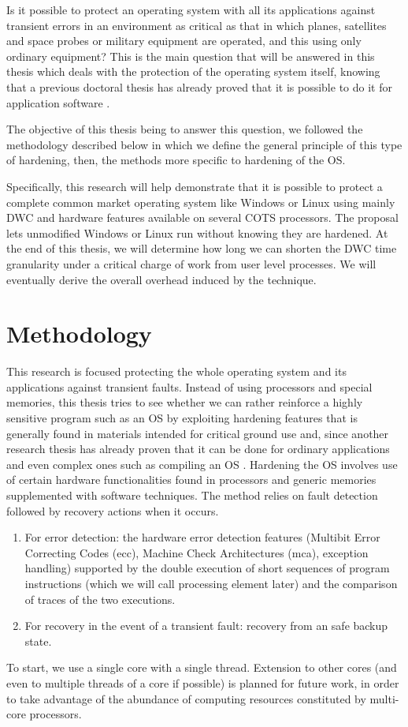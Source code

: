 Is it possible to protect an operating system with all its applications against transient errors in an environment as critical as that in which planes, satellites and space probes or military equipment are operated, and this using only ordinary equipment? This is the main question that will be answered in this thesis which deals with the protection of the operating system itself, knowing that a previous doctoral thesis has already proved that it is possible to do it for application software \citep{emery_assogba}.

The objective of this thesis being to answer this question, we followed the methodology described below in which we define the general principle of this type of hardening, then, the methods more specific to hardening of the OS.

Specifically, this research will help demonstrate that it is possible to protect a complete common market operating system like Windows or Linux using mainly DWC and hardware features available on several COTS processors. The proposal lets unmodified Windows or Linux run without knowing they are hardened. At the end of this thesis, we will determine how long we can shorten the DWC time granularity under a critical charge of work from user level processes. We will eventually derive the overall overhead induced by the technique.

\section{Methodology}
This research is focused protecting the whole operating system and its applications against transient faults. 
Instead of using processors and special memories, this thesis tries to see whether we can rather reinforce a highly sensitive program such as an OS by exploiting hardening features that is generally found in materials intended for critical ground use and, since another research thesis has already proven that it can be done for ordinary applications and even complex ones such as compiling an OS \citep{emery_assogba}. Hardening the OS involves use of certain hardware functionalities found in processors and generic memories supplemented with software techniques. The method relies on fault detection followed by recovery actions when it occurs.
\begin{enumerate}
	\item
For error detection: the hardware error detection features (Multibit Error Correcting Codes (\acrshort{ecc}), Machine Check Architectures (\acrshort{mca}), exception handling) supported by the double execution of short sequences of program instructions (which we will call processing element later) and the comparison of traces of the two executions.
	\item
	For recovery in the event of a transient fault: recovery from an safe backup state.
\end{enumerate}
To start, we use a single core with a single thread. Extension to other cores (and even to multiple threads of a core if possible) is planned for future work, in order to take advantage of the abundance of computing resources constituted by multi-core processors.

